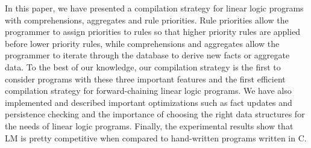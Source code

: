 In this paper, we have presented a compilation strategy for linear logic
programs with comprehensions, aggregates and rule priorities. Rule priorities
allow the programmer to assign priorities to rules so that higher priority rules
are applied before lower priority rules, while comprehensions and aggregates
allow the programmer to iterate through the database to derive new facts or
aggregate data. To the best of our knowledge, our compilation strategy is the
first to consider programs with these three important features and the first
efficient compilation strategy for forward-chaining linear logic programs.
We have also implemented and described important optimizations
such as fact updates and persistence checking and the importance of choosing the
right data structures for the needs of linear logic programs.
Finally, the experimental results show that LM is pretty competitive when
compared to hand-written programs written in C.
